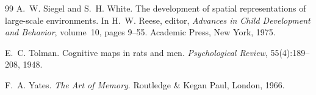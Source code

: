 \documentclass[11pt]{article}
\theoremstyle{remark}
\begin{document}
\begin{thebibliography}{99}
A.~W. Siegel and S.~H. White.
\newblock The development of spatial representations of large-scale environments.
\newblock In H.~W. Reese, editor, \emph{Advances in Child Development and Behavior}, volume~10, pages 9--55. Academic Press, New York, 1975.

E.~C. Tolman.
\newblock Cognitive maps in rats and men.
\newblock \emph{Psychological Review}, 55(4):189--208, 1948.

F.~A. Yates.
\newblock \emph{The Art of Memory}.
\newblock Routledge \& Kegan Paul, London, 1966.

\end{thebibliography}
\end{document}
